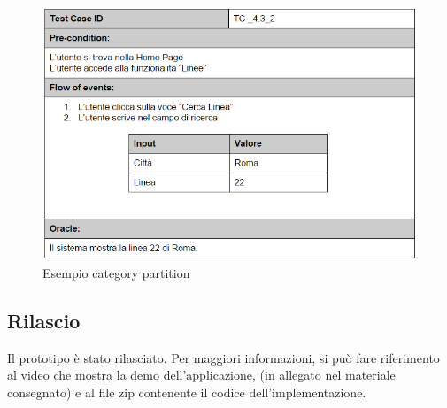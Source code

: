 \begin{figure}[h]
\centering
\includegraphics[scale=.6]{img/23.png}
\caption{Esempio category partition }
\label{fig:mhs}
\end{figure} 

\subsection{Rilascio}
Il prototipo \`{e} stato rilasciato. Per maggiori informazioni, si pu\`{o} fare riferimento al video che mostra la demo dell\rq applicazione, (in allegato nel materiale consegnato) e al file zip contenente il codice dell\rq implementazione.
